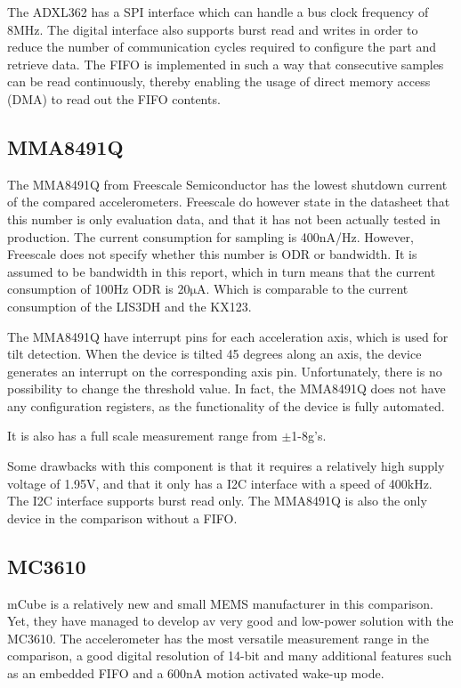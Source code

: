 The ADXL362 has a SPI interface which can handle a bus clock frequency of 8MHz. The digital interface also supports burst read and writes in order to reduce the number of communication cycles required to configure the part and retrieve data. The FIFO is implemented in such a way that consecutive samples can be read continuously, thereby enabling the usage of direct memory
access (DMA) to read out the FIFO contents.

\subsection{MMA8491Q}

The MMA8491Q from Freescale Semiconductor has the lowest shutdown current of the compared accelerometers. Freescale do however state in the datasheet \cite[p~9]{MMA8491Q} that this number is only evaluation data, and that it has not been actually tested in production. The current consumption for sampling is 400nA/Hz. However, Freescale does not specify whether this number is ODR or bandwidth. It is assumed to be bandwidth in this report, which in turn means that the current consumption of 100Hz ODR is 20$\si{\micro\ampere}$. Which is comparable to the current consumption of the LIS3DH and the KX123.  

The MMA8491Q have interrupt pins for each acceleration axis, which is used for tilt detection. When the device is tilted 45 degrees along an axis, the device generates an interrupt on the corresponding axis pin. Unfortunately, there is no possibility to change the threshold value. In fact, the MMA8491Q does not have any configuration registers, as the functionality of the device is fully automated. 

It is also has a full scale measurement range from $\pm$1-8g's.

Some drawbacks with this component is that it requires a relatively high supply voltage of 1.95V, and that it only has a I2C interface with a speed of 400kHz. The I2C interface supports burst read only. The MMA8491Q is also the only device in the comparison without a FIFO. 


\subsection{MC3610}
mCube is a relatively new and small MEMS manufacturer in this comparison. Yet, they have managed to develop av very good and low-power solution with the MC3610. The accelerometer has the most versatile measurement range in the comparison, a good digital resolution of 14-bit and many additional features such as an embedded FIFO and a 600nA motion activated wake-up mode. 

